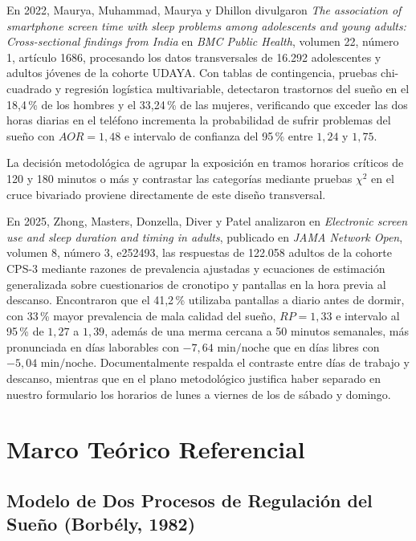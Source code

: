 \documentclass[12pt, letterpaper]{article}
\begin{document}
En 2022, Maurya, Muhammad, Maurya y Dhillon divulgaron \textit{The association of smartphone screen time with sleep problems among adolescents and young adults: Cross-sectional findings from India} en \textit{BMC Public Health}, volumen 22, número 1, artículo 1686, procesando los datos transversales de 16.292 adolescentes y adultos jóvenes de la cohorte UDAYA. Con tablas de contingencia, pruebas chi-cuadrado y regresión logística multivariable, detectaron trastornos del sueño en el 18,4\,\% de los hombres y el 33,24\,\% de las mujeres, verificando que exceder las dos horas diarias en el teléfono incrementa la probabilidad de sufrir problemas del sueño con $AOR = 1{,}48$ e intervalo de confianza del 95\,\% entre $1{,}24$ y $1{,}75$.

La decisión metodológica de agrupar la exposición en tramos horarios críticos de 120 y 180 minutos o más y contrastar las categorías mediante pruebas $\chi^2$ en el cruce bivariado proviene directamente de este diseño transversal.

En 2025, Zhong, Masters, Donzella, Diver y Patel analizaron en \textit{Electronic screen use and sleep duration and timing in adults}, publicado en \textit{JAMA Network Open}, volumen 8, número 3, e252493, las respuestas de 122.058 adultos de la cohorte CPS-3 mediante razones de prevalencia ajustadas y ecuaciones de estimación generalizada sobre cuestionarios de cronotipo y pantallas en la hora previa al descanso. Encontraron que el 41,2\,\% utilizaba pantallas a diario antes de dormir, con 33\,\% mayor prevalencia de mala calidad del sueño, $RP = 1{,}33$ e intervalo al 95\,\% de $1{,}27$ a $1{,}39$, además de una merma cercana a 50 minutos semanales, más pronunciada en días laborables con $-7{,}64\text{ min/noche}$ que en días libres con $-5{,}04\text{ min/noche}$. Documentalmente respalda el contraste entre días de trabajo y descanso, mientras que en el plano metodológico justifica haber separado en nuestro formulario los horarios de lunes a viernes de los de sábado y domingo.


\section{Marco Teórico Referencial}

\subsection{Modelo de Dos Procesos de Regulación del Sueño (Borbély, 1982)}
\end{document}
